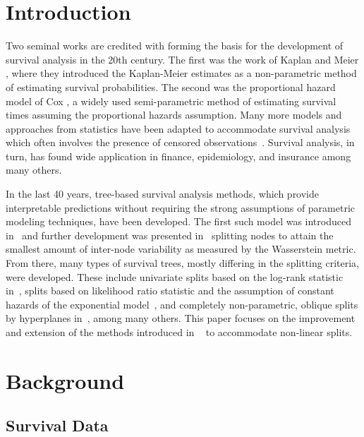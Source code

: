 \documentclass[sn-mathphys]{sn-jnl}%
\theoremstyle{thmstyleone}%
\theoremstyle{thmstyletwo}%
\theoremstyle{thmstylethree}%
\begin{document}
\section{Introduction} \label{sec:intro}


Two seminal works are credited with forming the basis for the development of survival analysis in the 20th century. The first was the work of Kaplan and Meier \cite{kaplanmeier}, where they introduced the Kaplan-Meier estimates as a non-parametric method of estimating survival probabilities.  The second was the proportional hazard model of Cox \cite{cox}, a widely used semi-parametric method of estimating survival times assuming the proportional hazards assumption.  Many more models and approaches from statistics have been adapted to accommodate survival analysis which often involves the presence of censored observations~\cite{oakes2001biometrika}. Survival analysis, in turn, has found wide application in finance, epidemiology, and insurance among many others.

In the last 40 years, tree-based survival analysis methods, which provide interpretable predictions without requiring the strong assumptions of parametric modeling techniques, have been developed. The first such model was introduced in~\cite{ciampi} and further development was presented in~\cite{gordonolshen} splitting nodes to attain the smallest amount of inter-node variability as measured by the Wasserstein metric. From there, many types of survival trees, mostly differing in the splitting criteria, were developed. These include univariate splits based on the log-rank statistic in~\cite{leblanccrowley}, splits based on likelihood ratio statistic and the assumption of constant hazards of the exponential model~\cite{bou2011review}, and completely non-parametric, oblique splits by hyperplanes in~\cite{kretowska}, among many others. This paper focuses on the improvement and extension of the methods introduced in ~\cite{kretowska} to accommodate non-linear splits. 



\section{Background}

\subsection{Survival Data}
\end{document}
